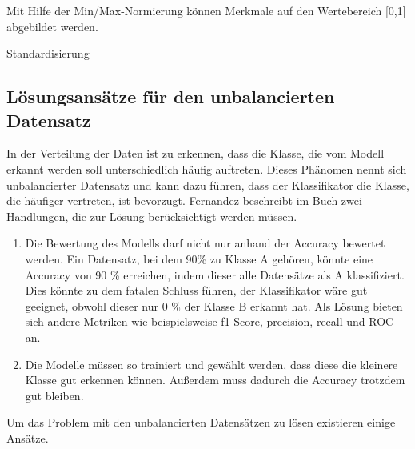 Mit Hilfe der Min/Max-Normierung können Merkmale auf den Wertebereich [0,1] abgebildet werden. 

Standardisierung








\subsection{Lösungsansätze für den unbalancierten Datensatz}
In der Verteilung der Daten ist zu erkennen, dass die Klasse, die vom Modell erkannt werden soll unterschiedlich häufig auftreten. 
Dieses Phänomen nennt sich unbalancierter Datensatz und kann dazu führen, dass der Klassifikator die Klasse, die häufiger vertreten, ist bevorzugt. 
Fernandez beschreibt im Buch \cite{Chapter 2 Foundations on Imbalanced Classification von Fernandez}  zwei Handlungen, die zur Lösung berücksichtigt werden müssen. 

\begin{enumerate}
 \item Die Bewertung des Modells darf nicht nur anhand der Accuracy bewertet werden. Ein Datensatz, bei dem 90\% zu Klasse A gehören, könnte eine Accuracy von 90 \% erreichen, indem dieser alle Datensätze als A klassifiziert. Dies könnte zu dem fatalen Schluss führen, der Klassifikator wäre gut geeignet, obwohl dieser nur 0 \% der Klasse B erkannt hat. Als Lösung bieten sich andere Metriken wie beispielsweise f1-Score, precision, recall und ROC an.  
 \item Die Modelle müssen so trainiert und gewählt werden, dass diese die kleinere Klasse gut erkennen können. Außerdem muss dadurch die Accuracy trotzdem gut bleiben. 
\end{enumerate}  \cite{Chapter 2 Foundations on Imbalanced Classification von Fernandez} 

Um das Problem mit den unbalancierten Datensätzen zu lösen existieren einige Ansätze. 
\cite{Chapter 2 Foundations on Imbalanced Classification von Fernandez} 

